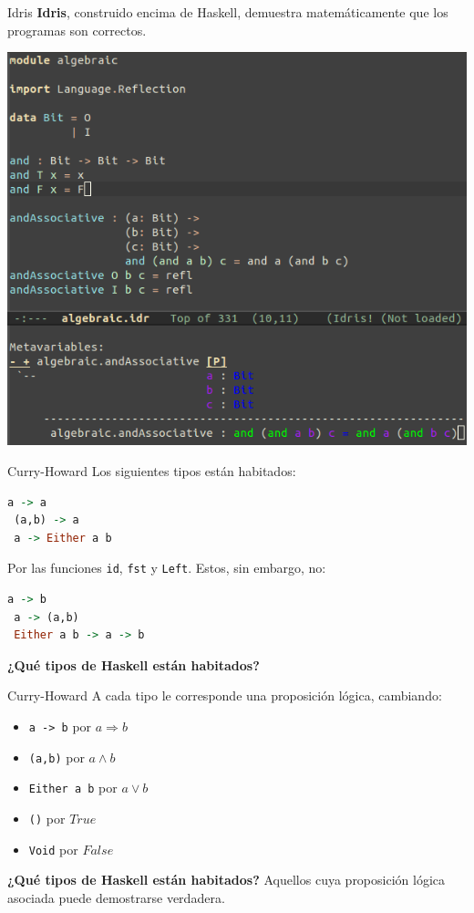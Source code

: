 \begin{frame}[fragile]{Idris}
  \textbf{Idris}, construido encima de Haskell, demuestra
  matemáticamente que los
  programas son correctos.

  \begin{center}
  \includegraphics[scale=0.28]{./images/idris.png}
  \end{center}
\end{frame}


\begin{frame}[fragile]{Curry-Howard}
 Los siguientes tipos están habitados:
 \begin{lstlisting}[language=haskell]
 a -> a
 (a,b) -> a
 a -> Either a b
 \end{lstlisting}
 Por las funciones \texttt{id}, \texttt{fst} y \texttt{Left}.
 Estos, sin embargo, no:
 \begin{lstlisting}[language=haskell]
 a -> b
 a -> (a,b)
 Either a b -> a -> b
 \end{lstlisting}

 \textbf{¿Qué tipos de Haskell están habitados?}
\end{frame}


\begin{frame}[fragile]{Curry-Howard}
 A cada tipo le corresponde una proposición lógica, cambiando:
 \begin{itemize}
  \item \texttt{a -> b} por $a \Rightarrow b$
  \item \texttt{(a,b)} por $a \wedge b$
  \item \texttt{Either a b} por $a \vee b$
  \item \texttt{()} por $True$
  \item \texttt{Void} por $False$
 \end{itemize}

 \espacio
 \textbf{¿Qué tipos de Haskell están habitados?} Aquellos cuya
 proposición lógica asociada puede demostrarse verdadera.
\end{frame}


